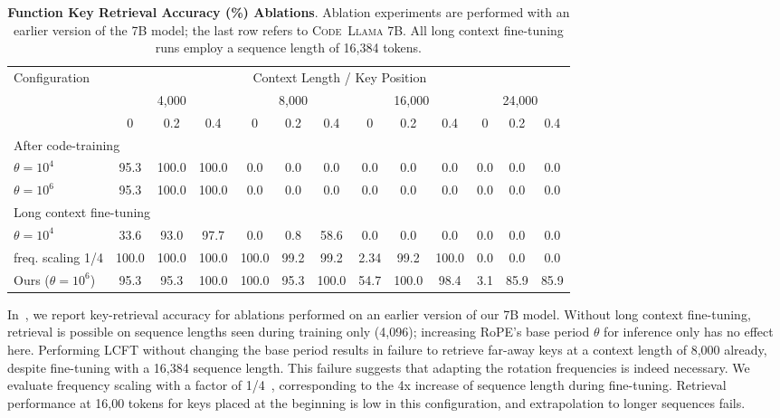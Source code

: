 \documentclass[10pt]{article}
\newcommand{\model}{\textsc{Code~Llama}\xspace}
\begin{document}
\begin{table}[]
\centering
\begin{tabular}{lccc|ccc|ccc|ccc}
\toprule
Configuration & \multicolumn{12}{c}{{Context Length / Key Position}} \\
& \multicolumn{3}{c}{4,000} & \multicolumn{3}{c}{8,000} & \multicolumn{3}{c}{16,000} & \multicolumn{3}{c}{24,000} \\
& 0 & 0.2 & 0.4 & 0 & 0.2 & 0.4 & 0 & 0.2 & 0.4 & 0 & 0.2 & 0.4 \\
\midrule
\multicolumn{13}{l}{After code-training} \\
\midrule
$\theta=10^4$ & 95.3 & 100.0 & 100.0 & 0.0 & 0.0 & 0.0 & 0.0 & 0.0 & 0.0 & 0.0 & 0.0 & 0.0 \\
$\theta=10^6$ & 95.3 & 100.0 & 100.0 & 0.0 & 0.0 & 0.0 & 0.0 & 0.0 & 0.0 & 0.0 & 0.0 & 0.0\\
\midrule
\multicolumn{13}{l}{Long context fine-tuning} \\
\midrule
$\theta=10^4$ & 33.6 & 93.0 & 97.7 & 0.0 & 0.8 & 58.6 & 0.0 & 0.0 &  0.0 & 0.0 & 0.0 & 0.0 \\
freq. scaling 1/4 & 100.0 & 100.0 & 100.0 & 100.0 & 99.2 & 99.2 & 2.34 & 99.2 & 100.0 & 0.0 & 0.0 & 0.0 \\
\midrule
Ours ($\theta=10^6$) & 95.3 & 95.3 & 100.0 & 100.0 & 95.3 & 100.0 & 54.7 & 100.0 & 98.4 & 3.1 & 85.9 & 85.9 \\
\bottomrule
\end{tabular}\caption{\textbf{Function Key Retrieval Accuracy (\%) Ablations}. Ablation experiments are performed with an earlier version of the 7B model; the last row refers to \model 7B. All long context fine-tuning runs employ a sequence length of 16,384 tokens.
}
\label{tab:retrieval_results_ablations}
\end{table}

In~, we report key-retrieval accuracy for ablations performed on an earlier version of our 7B model.
Without long context fine-tuning, retrieval is possible on sequence lengths seen during training only (4,096); increasing RoPE's base period $\theta$ for inference only has no effect here.
Performing LCFT without changing the base period results in failure to retrieve far-away keys at a context length of 8,000 already, despite fine-tuning with a 16,384 sequence length.
This failure suggests that adapting the rotation frequencies is indeed necessary.
We evaluate frequency scaling with a factor of 1/4~\citep{chen2023extending}, corresponding to the 4x increase of sequence length during fine-tuning.
Retrieval performance at 16,00 tokens for keys placed at the beginning is low in this configuration, and extrapolation to longer sequences fails.
\end{document}
